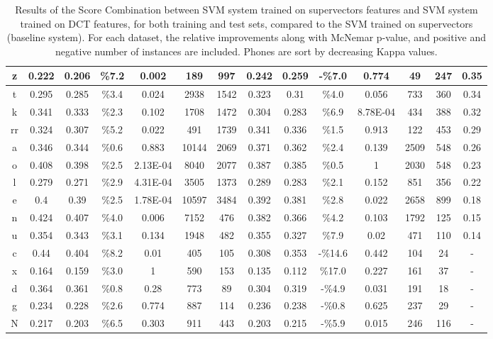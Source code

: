 \begin{table}[H]
{\begin{tabular}{|c| |c|c|c|c|c|c| |c|c|c|c|c|c| |c|}
\rowcolor{lightgray} z & 0.222 & 0.206 & \%7.2 & 0.002 & 189 & 997 & 0.242 & 0.259 & -\%7.0 & 0.774 & 49 & 247 & 0.35 \\ \hline
\rowcolor{lightgray} t & 0.295 & 0.285 & \%3.4 & 0.024 & 2938 & 1542 & 0.323 & 0.31 & \%4.0 & 0.056 & 733 & 360 & 0.34 \\ \hline
k & 0.341 & 0.333 & \%2.3 & 0.102 & 1708 & 1472 & 0.304 & 0.283 & \%6.9 & 8.78E-04 & 434 & 388 & 0.32 \\ \hline
\rowcolor{lightgray} rr & 0.324 & 0.307 & \%5.2 & 0.022 & 491 & 1739 & 0.341 & 0.336 & \%1.5 & 0.913 & 122 & 453 & 0.29 \\ \hline
a & 0.346 & 0.344 & \%0.6 & 0.883 & 10144 & 2069 & 0.371 & 0.362 & \%2.4 & 0.139 & 2509 & 548 & 0.26 \\ \hline
\rowcolor{lightgray} o & 0.408 & 0.398 & \%2.5 & 2.13E-04 & 8040 & 2077 & 0.387 & 0.385 & \%0.5 & 1 & 2030 & 548 & 0.23 \\ \hline
\rowcolor{lightgray} l & 0.279 & 0.271 & \%2.9 & 4.31E-04 & 3505 & 1373 & 0.289 & 0.283 & \%2.1 & 0.152 & 851 & 356 & 0.22 \\ \hline
\rowcolor{lightgray} e & 0.4 & 0.39 & \%2.5 & 1.78E-04 & 10597 & 3484 & 0.392 & 0.381 & \%2.8 & 0.022 & 2658 & 899 & 0.18 \\ \hline
\rowcolor{lightgray} n & 0.424 & 0.407 & \%4.0 & 0.006 & 7152 & 476 & 0.382 & 0.366 & \%4.2 & 0.103 & 1792 & 125 & 0.15 \\ \hline
u & 0.354 & 0.343 & \%3.1 & 0.134 & 1948 & 482 & 0.355 & 0.327 & \%7.9 & 0.02 & 471 & 110 & 0.14 \\ \hline
c & 0.44 & 0.404 & \%8.2 & 0.01 & 405 & 105 & 0.308 & 0.353 & -\%14.6 & 0.442 & 104 & 24 & - \\ \hline
x & 0.164 & 0.159 & \%3.0 & 1 & 590 & 153 & 0.135 & 0.112 & \%17.0 & 0.227 & 161 & 37 & - \\ \hline
d & 0.364 & 0.361 & \%0.8 & 0.28 & 773 & 89 & 0.304 & 0.319 & -\%4.9 & 0.031 & 191 & 18 & - \\ \hline
g & 0.234 & 0.228 & \%2.6 & 0.774 & 887 & 114 & 0.236 & 0.238 & -\%0.8 & 0.625 & 237 & 29 & - \\ \hline
N & 0.217 & 0.203 & \%6.5 & 0.303 & 911 & 443 & 0.203 & 0.215 & -\%5.9 & 0.015 & 246 & 116 & - \\ \hline
\end{tabular}

}
\caption{Results of the Score Combination between SVM system trained on supervectors features 
and SVM system trained on DCT features,
for both training and test sets, compared to the SVM trained on supervectors (baseline system).
For each dataset, the relative improvements along with McNemar p-value, and
positive and negative number of instances are included. Phones are sort by decreasing Kappa values.}
\label{tab:scoreCombinationAppendixTable}
\end{table}

